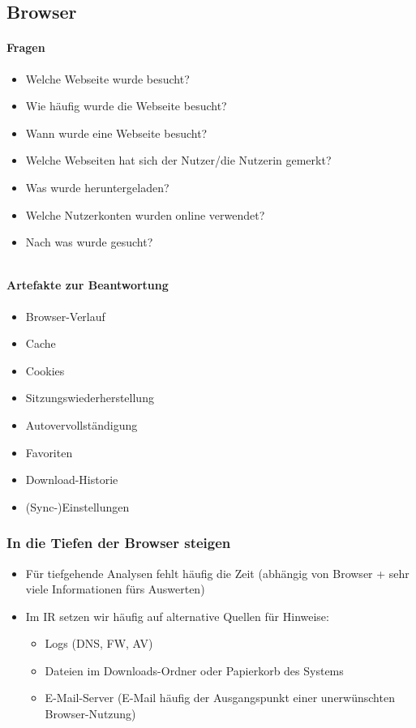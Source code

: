 \subsection{Browser}
\begin{minipage}{0.6\linewidth}
    \paragraph{Fragen}
    \begin{itemize}
        \item Welche Webseite wurde besucht?
        \item Wie häufig wurde die Webseite besucht?
        \item Wann wurde eine Webseite besucht?
        \item Welche Webseiten hat sich der Nutzer/die Nutzerin gemerkt?
        \item Was wurde heruntergeladen?
        \item Welche Nutzerkonten wurden online verwendet?
        \item Nach was wurde gesucht?
    \end{itemize}
    \vfill
    $ $
\end{minipage}
\begin{minipage}{0.4\linewidth}
    \paragraph{Artefakte zur Beantwortung}
    \begin{itemize}
        \item Browser-Verlauf
        \item Cache
        \item Cookies
        \item Sitzungswiederherstellung
        \item Autovervollständigung
        \item Favoriten
        \item Download-Historie
        \item (Sync-)Einstellungen
    \end{itemize}
\end{minipage}

\subsubsection{In die Tiefen der Browser steigen}
\begin{itemize}
    \item Für tiefgehende Analysen fehlt häufig die Zeit (abhängig von Browser + sehr viele Informationen fürs Auswerten)
    \item Im IR setzen wir häufig auf alternative Quellen für Hinweise:
    \begin{itemize}
        \item Logs (DNS, FW, AV)
        \item Dateien im Downloads-Ordner oder Papierkorb des Systems
        \item E-Mail-Server (E-Mail häufig der Ausgangspunkt einer unerwünschten Browser-Nutzung)
    \end{itemize}
\end{itemize}